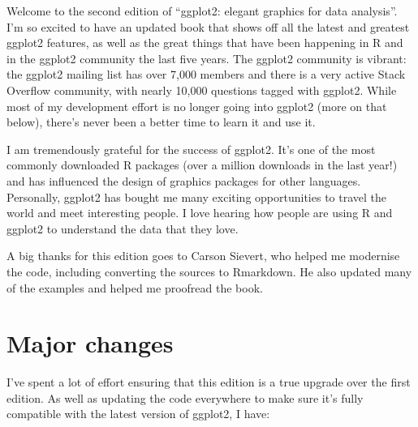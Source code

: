 \preface

Welcome to the second edition of ``ggplot2: elegant graphics for data
analysis''. I'm so excited to have an updated book that shows off all
the latest and greatest ggplot2 features, as well as the great things
that have been happening in R and in the ggplot2 community the last five
years. The ggplot2 community is vibrant: the ggplot2 mailing list has
over 7,000 members and there is a very active Stack Overflow community,
with nearly 10,000 questions tagged with ggplot2. While most of my
development effort is no longer going into ggplot2 (more on that below),
there's never been a better time to learn it and use it.

I am tremendously grateful for the success of ggplot2. It's one of the
most commonly downloaded R packages (over a million downloads in the
last year!) and has influenced the design of graphics packages for other
languages. Personally, ggplot2 has bought me many exciting opportunities
to travel the world and meet interesting people. I love hearing how
people are using R and ggplot2 to understand the data that they love.

A big thanks for this edition goes to Carson Sievert, who helped me
modernise the code, including converting the sources to Rmarkdown. He
also updated many of the examples and helped me proofread the book.

\section*{Major changes}

I've spent a lot of effort ensuring that this edition is a true upgrade
over the first edition. As well as updating the code everywhere to make
sure it's fully compatible with the latest version of ggplot2, I have:

